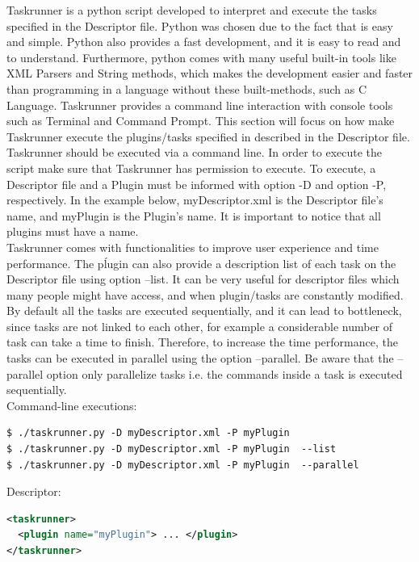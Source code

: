 \documentclass[a4paper, 12pt]{article}
\begin{document}
	Taskrunner is a python script developed to interpret and execute the tasks specified in the Descriptor file. Python was chosen due to the fact that is
easy and simple. Python also provides a fast development, and it is easy to read and to understand. Furthermore, python comes with many useful built-in
tools like XML Parsers and String methods, which makes the development easier and faster than programming in a language without these built-methods,
such as C Language. Taskrunner provides a command line interaction with console tools such as Terminal and Command Prompt. This section will focus on
how make Taskrunner execute the plugins/tasks specified in described in the Descriptor file.\\

	Taskrunner should be executed via a command line. In order to execute the script make sure that Taskrunner has permission to execute. To execute,
a Descriptor file and a Plugin must be informed with option -D and option -P, respectively. In the example below, myDescriptor.xml is the Descriptor
file’s name, and myPlugin is the Plugin’s name. It is important to notice that all plugins must have a name. \\

	Taskrunner comes with functionalities to improve user experience and time performance. The pĺugin can also provide a description list of each task
on the Descriptor file using option --list. It can be very useful for descriptor files which many people might have access, and when plugin/tasks are
constantly modified. By default all the tasks are executed sequentially, and it can lead to bottleneck, since tasks are not linked to each other, for
example a considerable number of task can take a time to finish. Therefore, to increase the time performance, the tasks can be executed in parallel
using the option --parallel. Be aware that the --parallel option only parallelize tasks i.e. the commands inside a task is executed sequentially.\\

\noindent
Command-line executions:
\begin{lstlisting}
$ ./taskrunner.py -D myDescriptor.xml -P myPlugin
$ ./taskrunner.py -D myDescriptor.xml -P myPlugin  --list
$ ./taskrunner.py -D myDescriptor.xml -P myPlugin  --parallel
\end{lstlisting}

\noindent
Descriptor:
\begin{lstlisting}[language=xml]
<taskrunner>
  <plugin name="myPlugin"> ... </plugin>
</taskrunner>
\end{lstlisting}
\end{document}
